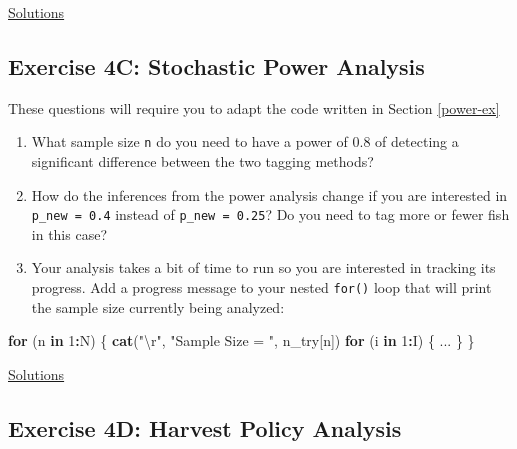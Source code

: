 \documentclass[]{book}
\newenvironment{Shaded}{\begin{snugshade}}{\end{snugshade}}
\newcommand{\CharTok}[1]{\textcolor[rgb]{0.31,0.60,0.02}{#1}}
\newcommand{\ControlFlowTok}[1]{\textcolor[rgb]{0.13,0.29,0.53}{\textbf{#1}}}
\newcommand{\DecValTok}[1]{\textcolor[rgb]{0.00,0.00,0.81}{#1}}
\newcommand{\KeywordTok}[1]{\textcolor[rgb]{0.13,0.29,0.53}{\textbf{#1}}}
\newcommand{\NormalTok}[1]{#1}
\newcommand{\OperatorTok}[1]{\textcolor[rgb]{0.81,0.36,0.00}{\textbf{#1}}}
\newcommand{\StringTok}[1]{\textcolor[rgb]{0.31,0.60,0.02}{#1}}
\providecommand{\tightlist}{%
  \setlength{\itemsep}{0pt}\setlength{\parskip}{0pt}}
\begin{document}
\protect\hyperlink{ex4b-answers}{Solutions}

\hypertarget{exercise-4c-stochastic-power-analysis}{%
\subsection*{Exercise 4C: Stochastic Power Analysis}\label{exercise-4c-stochastic-power-analysis}}

These questions will require you to adapt the code written in Section \ref{power-ex}

\begin{enumerate}
\def\labelenumi{\arabic{enumi}.}
\tightlist
\item
  What sample size \texttt{n} do you need to have a power of 0.8 of detecting a significant difference between the two tagging methods?
\item
  How do the inferences from the power analysis change if you are interested in \texttt{p\_new\ =\ 0.4} instead of \texttt{p\_new\ =\ 0.25}? Do you need to tag more or fewer fish in this case?
\item
  Your analysis takes a bit of time to run so you are interested in tracking its progress. Add a progress message to your nested \texttt{for()} loop that will print the sample size currently being analyzed:
\end{enumerate}

\begin{Shaded}
\begin{Highlighting}[]
\ControlFlowTok{for}\NormalTok{ (n }\ControlFlowTok{in} \DecValTok{1}\OperatorTok{:}\NormalTok{N) \{}
  \KeywordTok{cat}\NormalTok{(}\StringTok{"}\CharTok{\textbackslash{}r}\StringTok{"}\NormalTok{, }\StringTok{"Sample Size = "}\NormalTok{, n_try[n])}
  \ControlFlowTok{for}\NormalTok{ (i }\ControlFlowTok{in} \DecValTok{1}\OperatorTok{:}\NormalTok{I) \{}
\NormalTok{    ...}
\NormalTok{  \}}
\NormalTok{\}}
\end{Highlighting}
\end{Shaded}

\protect\hyperlink{ex4c-answers}{Solutions}

\hypertarget{exercise-4d-harvest-policy-analysis}{%
\subsection*{Exercise 4D: Harvest Policy Analysis}\label{exercise-4d-harvest-policy-analysis}}
\end{document}
